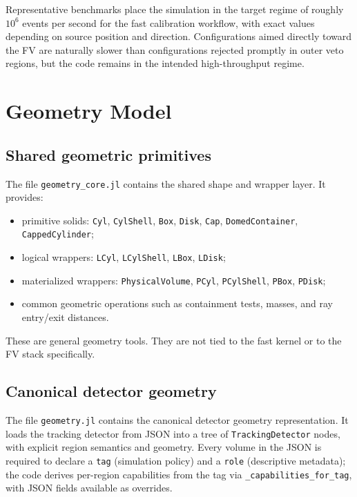 \documentclass[11pt]{article}
\begin{document}
Representative benchmarks place the simulation in the target regime of roughly
$10^6$ events per second for the fast calibration workflow, with exact values
depending on source position and direction. Configurations aimed directly toward
the FV are naturally slower than configurations rejected promptly in outer veto
regions, but the code remains in the intended high-throughput regime.

\section{Geometry Model}

\subsection{Shared geometric primitives}

The file \texttt{geometry\_core.jl} contains the shared shape and wrapper layer.
It provides:

\begin{itemize}
\item primitive solids:
  \texttt{Cyl}, \texttt{CylShell}, \texttt{Box}, \texttt{Disk},
  \texttt{Cap}, \texttt{DomedContainer}, \texttt{CappedCylinder};
\item logical wrappers:
  \texttt{LCyl}, \texttt{LCylShell}, \texttt{LBox}, \texttt{LDisk};
\item materialized wrappers:
  \texttt{PhysicalVolume}, \texttt{PCyl}, \texttt{PCylShell},
  \texttt{PBox}, \texttt{PDisk};
\item common geometric operations such as containment tests, masses, and
ray entry/exit distances.
\end{itemize}

These are general geometry tools. They are not tied to the fast kernel or to the
FV stack specifically.

\subsection{Canonical detector geometry}

The file \texttt{geometry.jl} contains the canonical detector geometry
representation. It loads the tracking detector from JSON into a tree of
\texttt{TrackingDetector} nodes, with explicit region semantics and geometry.
Every volume in the JSON is required to declare a \texttt{tag} (simulation
policy) and a \texttt{role} (descriptive metadata); the code derives
per-region capabilities from the tag via \texttt{\_capabilities\_for\_tag},
with JSON fields available as overrides.
\end{document}
